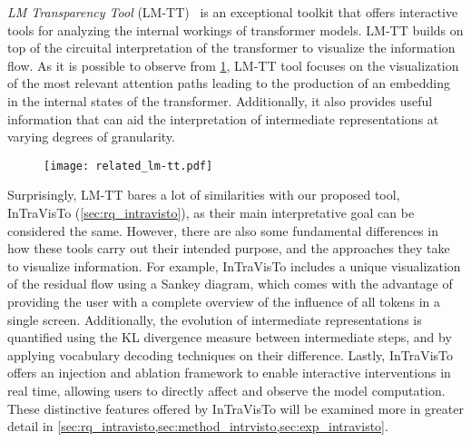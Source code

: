 \textit{LM Transparency Tool} (LM-TT)~\cite{tufanov2024} is an exceptional toolkit that offers interactive tools for analyzing the internal workings of transformer models.
LM-TT builds on top of the circuital interpretation of the transformer to visualize the information flow.
As it is possible to observe from \cref{fig:related_lm-tt}, LM-TT tool focuses on the visualization of the most relevant attention paths leading to the production of an embedding in the internal states of the transformer.
Additionally, it also provides useful information that can aid the interpretation of intermediate representations at varying degrees of granularity.

\begin{figure}[t!]
    \centering
    \texttt{[image: related\_lm-tt.pdf]}
    \caption{}
    \label{fig:related_lm-tt}
\end{figure}

Surprisingly, LM-TT bares a lot of similarities with our proposed tool, InTraVisTo (\cref{sec:rq_intravisto}), as their main interpretative goal can be considered the same.
However, there are also some fundamental differences in how these tools carry out their intended purpose, and the approaches they take to visualize information.
For example, InTraVisTo includes a unique visualization of the residual flow using a Sankey diagram, which comes with the advantage of providing the user with a complete overview of the influence of all tokens in a single screen.
Additionally, the evolution of intermediate representations is quantified using the KL divergence measure between intermediate steps, and by applying vocabulary decoding techniques on their difference.
Lastly, InTraVisTo offers an injection and ablation framework to enable interactive interventions in real time, allowing users to directly affect and observe the model computation.
These distinctive features offered by InTraVisTo will be examined more in greater detail in \cref{sec:rq_intravisto,sec:method_intrvisto,sec:exp_intravisto}.